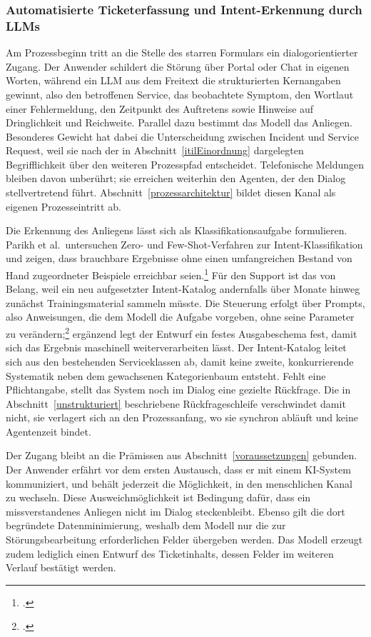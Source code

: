 \subsubsection{Automatisierte Ticketerfassung und Intent-Erkennung durch LLMs}
\label{ticketerfassung}

Am Prozessbeginn tritt an die Stelle des starren Formulars ein dialogorientierter Zugang. Der Anwender schildert die St\"orung \"uber Portal oder Chat in eigenen Worten, w\"ahrend ein LLM aus dem Freitext die strukturierten Kernangaben gewinnt, also den betroffenen Service, das beobachtete Symptom, den Wortlaut einer Fehlermeldung, den Zeitpunkt des Auftretens sowie Hinweise auf Dringlichkeit und Reichweite. Parallel dazu bestimmt das Modell das Anliegen. Besonderes Gewicht hat dabei die Unterscheidung zwischen Incident und Service Request, weil sie nach der in Abschnitt~\ref{itilEinordnung} dargelegten Begrifflichkeit \"uber den weiteren Prozesspfad entscheidet. Telefonische Meldungen bleiben davon unber\"uhrt; sie erreichen weiterhin den Agenten, der den Dialog stellvertretend f\"uhrt. Abschnitt~\ref{prozessarchitektur} bildet diesen Kanal als eigenen Prozesseintritt ab.

Die Erkennung des Anliegens l\"asst sich als Klassifikationsaufgabe formulieren. Parikh et al.~untersuchen Zero- und Few-Shot-Verfahren zur Intent-Klassifikation und zeigen, dass brauchbare Ergebnisse ohne einen umfangreichen Bestand von Hand zugeordneter Beispiele erreichbar seien.\footcite[Vgl.][hier S.~744\,f.]{Parikh2023} F\"ur den Support ist das von Belang, weil ein neu aufgesetzter Intent-Katalog andernfalls \"uber Monate hinweg zun\"achst Trainingsmaterial sammeln m\"usste. Die Steuerung erfolgt \"uber Prompts, also Anweisungen, die dem Modell die Aufgabe vorgeben, ohne seine Parameter zu ver\"andern;\footcite[Vgl.][S.~1]{Sahoo2024} erg\"anzend legt der Entwurf ein festes Ausgabeschema fest, damit sich das Ergebnis maschinell weiterverarbeiten l\"asst. Der Intent-Katalog leitet sich aus den bestehenden Serviceklassen ab, damit keine zweite, konkurrierende Systematik neben dem gewachsenen Kategorienbaum entsteht. Fehlt eine Pflichtangabe, stellt das System noch im Dialog eine gezielte R\"uckfrage. Die in Abschnitt~\ref{unstrukturiert} beschriebene R\"uckfrageschleife verschwindet damit nicht, sie verlagert sich an den Prozessanfang, wo sie synchron abl\"auft und keine Agentenzeit bindet.

Der Zugang bleibt an die Pr\"amissen aus Abschnitt~\ref{voraussetzungen} gebunden. Der Anwender erf\"ahrt vor dem ersten Austausch, dass er mit einem KI-System kommuniziert, und beh\"alt jederzeit die M\"oglichkeit, in den menschlichen Kanal zu wechseln. Diese Ausweichm\"oglichkeit ist Bedingung daf\"ur, dass ein missverstandenes Anliegen nicht im Dialog steckenbleibt. Ebenso gilt die dort begr\"undete Datenminimierung, weshalb dem Modell nur die zur St\"orungsbearbeitung erforderlichen Felder \"ubergeben werden. Das Modell erzeugt zudem lediglich einen Entwurf des Ticketinhalts, dessen Felder im weiteren Verlauf best\"atigt werden.

